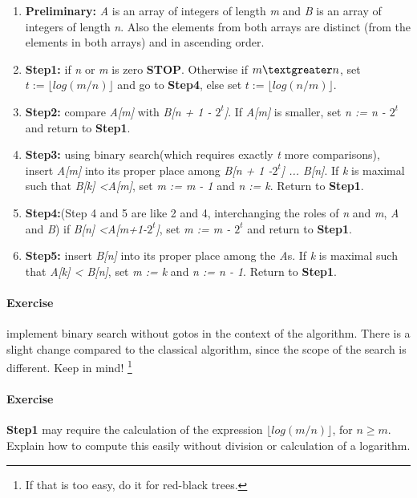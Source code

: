 \documentclass{article}
\newcommand{\percents}[1]{\protect \marginpar[l]{\bf [#1]}}
\newcounter{question}
\newcommand{\question}[1]{
  \addtocounter{question}{1}
  \paragraph{Exercise~\arabic{question}  \percents{#1}}
 }
\begin{document}
\begin{enumerate}
\item \textbf {Preliminary:} {\it A} is an array of integers of length
  {\it m} and {\it B} is an array of integers of length {\it n}. Also
  the elements from both arrays are distinct (from the elements in
  both arrays) and in ascending order.

\item \textbf{Step1:} if {\it n} or {\it m} is zero
  \textbf{STOP}. Otherwise if  $m\textgreater n$, set $t := \lfloor log
    \left ( m \slash n \right ) \rfloor $  and go to \textbf{Step4},
    else set $t := \lfloor log
    \left ( n \slash m \right ) \rfloor $.

\item \textbf{Step2:} compare {\it A[m]} with {\it B[n + 1 -
    $2^t$]}. If {\it A[m]} is smaller, set {\it n := n - $2^t$} and
  return to \textbf{Step1}.

\item \textbf{Step3:} using binary search(which requires exactly {\it
    t} more comparisons), insert {\it A[m]} into its proper place
  among {\it B[n + 1 -$2^t$] ... B[n]}. If {\it k} is maximal such
  that {\it B[k] \textless A[m]}, set {\it m := m - 1} and {\it n :=
    k}. Return to \textbf{Step1}.

\item \textbf{Step4:}(Step 4 and 5 are like 2 and 4, interchanging the
  roles of {\it n} and {\it m}, {\it A} and {\it B}) if {\it B[n]
    \textless A[m+1-$2^t$]}, set {\it m := m - $2^t$} and return to
  \textbf{Step1}.

\item \textbf{Step5:} insert {\it B[n]} into its proper place among
  the {\it A}s. If {\it k} is maximal such that {\it A[k] \textless
    B[n]}, set {\it m := k} and {\it n := n - 1}. Return to \textbf{Step1}.


\end{enumerate}


\question{*}

implement binary search without gotos in the context of the
algorithm. There is a slight change compared to the classical
algorithm, since the scope of the search is different. Keep in mind!
\footnote{If that is too easy, do it for red-black trees.}


\question{-}

\textbf{Step1} may require the calculation of the expression $\lfloor log
    \left ( m \slash n \right ) \rfloor $, for $n \geq m$. Explain how
    to compute this easily without division or calculation of a
    logarithm.  %
\end{document}
